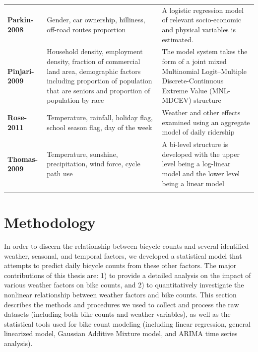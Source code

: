 \documentclass [11pt, proquest] {uwthesis}[2015/03/03]
\begin{document}
\begin{center}
\begin{scriptsize}
\begin{tabular}{p{3cm} p{7cm} p{5cm}}
  \textbf{Parkin-2008} & Gender, car ownership, hilliness, off-road routes proportion & A logistic regression model of relevant socio-economic and physical variables is estimated. \\
  \textbf{Pinjari-2009} & Household density, employment density, fraction of commercial land area, demographic factors including proportion of population that are seniors and proportion of population by race & The model system takes the form of a joint mixed Multinomial Logit–Multiple Discrete-Continuous Extreme Value (MNL-MDCEV) structure \\
  \textbf{Rose-2011} & Temperature, rainfall, holiday flag, school season flag, day of the week & Weather and other effects examined using an aggregate model of daily ridership \\
  \textbf{Thomas-2009} & Temperature, sunshine, precipitation, wind force, cycle path use & A bi-level structure is developed with the upper level being a log-linear model and the lower level being a linear model \\ [1ex] 
 \hline
\label{tb:lit}
\end{tabular}
\end{scriptsize}
\end{center}


 
\chapter{Methodology}


In order to discern the relationship between bicycle counts and several identified weather, seasonal, and temporal factors, we
developed a statistical model that attempts to predict daily bicycle counts from these other factors. The major contributions of this thesis are: 1) to provide a detailed analysis on the impact of various weather factors on bike counts, and 2) to quantitatively investigate the nonlinear relationship between weather factors and bike counts. This section describes the methods
and procedures we used to collect and process the raw datasets (including both bike counts and weather variables), as well as the statistical tools used for bike count modeling (including linear regression, general linearized model, Gaussian Additive Mixture model, and ARIMA time series analysis). 
\end{document}
